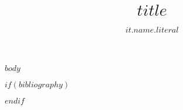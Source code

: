 \documentclass[$if(fontsize)$
$fontsize$,
$endif$
$if(papersize)$
$papersize$paper,
$endif$
$for(classoption)$
$classoption$$sep$,
$endfor$]{thesis-umich}
\title{\large $title$}
\author{$it.name.literal$}
\begin{document}
$body$

$if(bibliography)$


$endif$
\end{document}
